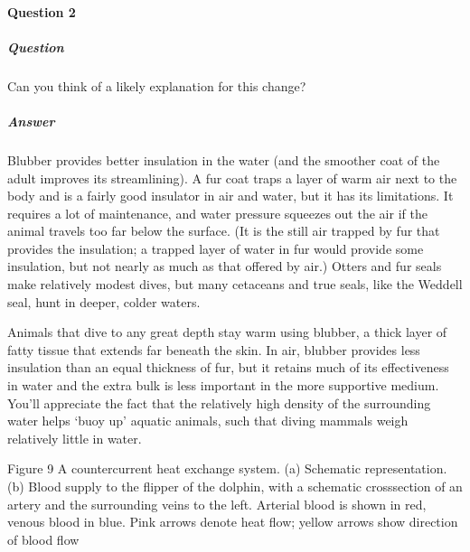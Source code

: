 \documentclass[letterpaper,10pt,english]{sphinxmanual}
\let\sphinxpxdimen\pdfpxdimen\else\newdimen\sphinxpxdimen
\begin{document}
\paragraph{Question 2}
\label{\detokenize{content/session_00/Part_00_02:Question-2}}


\subparagraph{Question}
\label{\detokenize{content/session_00/Part_00_02:id1}}
Can you think of a likely explanation for this change?


\subparagraph{Answer}
\label{\detokenize{content/session_00/Part_00_02:id2}}
Blubber provides better insulation in the water (and the smoother coat of the adult improves its streamlining). A fur coat traps a layer of warm air next to the body and is a fairly good insulator in air and water, but it has its limitations. It requires a lot of maintenance, and water pressure squeezes out the air if the animal travels too far below the surface. (It is the still air trapped by fur that provides the insulation; a trapped layer of water in fur would provide some insulation, but
not nearly as much as that offered by air.) Otters and fur seals make relatively modest dives, but many cetaceans and true seals, like the Weddell seal, hunt in deeper, colder waters.

Animals that dive to any great depth stay warm using blubber, a thick layer of fatty tissue that extends far beneath the skin. In air, blubber provides less insulation than an equal thickness of fur, but it retains much of its effectiveness in water and the extra bulk is less important in the more supportive medium. You’ll appreciate the fact that the relatively high density of the surrounding water helps ‘buoy up’ aquatic animals, such that diving mammals weigh relatively little in water.

\sphinxincludegraphics[width=780\sphinxpxdimen,height=311\sphinxpxdimen]{{s182_11_figure_8}.jpg}

Figure 9 A countercurrent heat exchange system. (a) Schematic representation. (b) Blood supply to the flipper of the dolphin, with a schematic cross\sphinxhyphen{}section of an artery and the surrounding veins to the left. Arterial blood is shown in red, venous blood in blue. Pink arrows denote heat flow; yellow arrows show direction of blood flow
\end{document}
